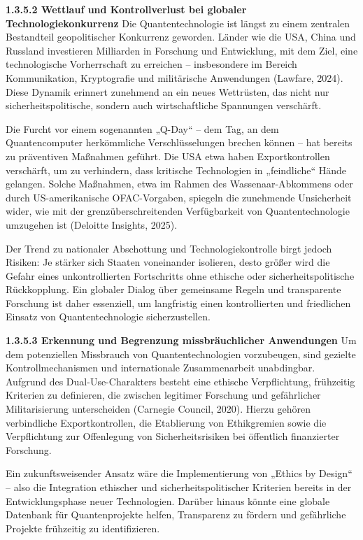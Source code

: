 \textbf{ 1.3.5.2 Wettlauf und Kontrollverlust bei globaler Technologiekonkurrenz} 
Die Quantentechnologie ist längst zu einem zentralen Bestandteil geopolitischer Konkurrenz geworden. Länder wie die USA, China und Russland investieren Milliarden in Forschung und Entwicklung, mit dem Ziel, eine technologische Vorherrschaft zu erreichen – insbesondere im Bereich Kommunikation, Kryptografie und militärische Anwendungen (Lawfare, 2024). Diese Dynamik erinnert zunehmend an ein neues Wettrüsten, das nicht nur sicherheitspolitische, sondern auch wirtschaftliche Spannungen verschärft.

Die Furcht vor einem sogenannten „Q-Day“ – dem Tag, an dem Quantencomputer herkömmliche Verschlüsselungen brechen können – hat bereits zu präventiven Maßnahmen geführt. Die USA etwa haben Exportkontrollen verschärft, um zu verhindern, dass kritische Technologien in „feindliche“ Hände gelangen. Solche Maßnahmen, etwa im Rahmen des Wassenaar-Abkommens oder durch US-amerikanische OFAC-Vorgaben, spiegeln die zunehmende Unsicherheit wider, wie mit der grenzüberschreitenden Verfügbarkeit von Quantentechnologie umzugehen ist (Deloitte Insights, 2025).

Der Trend zu nationaler Abschottung und Technologiekontrolle birgt jedoch Risiken: Je stärker sich Staaten voneinander isolieren, desto größer wird die Gefahr eines unkontrollierten Fortschritts ohne ethische oder sicherheitspolitische Rückkopplung. Ein globaler Dialog über gemeinsame Regeln und transparente Forschung ist daher essenziell, um langfristig einen kontrollierten und friedlichen Einsatz von Quantentechnologie sicherzustellen.

 \textbf{1.3.5.3 Erkennung und Begrenzung missbräuchlicher Anwendungen }
 Um dem potenziellen Missbrauch von Quantentechnologien vorzubeugen, sind gezielte Kontrollmechanismen und internationale Zusammenarbeit unabdingbar. Aufgrund des Dual-Use-Charakters besteht eine ethische Verpflichtung, frühzeitig Kriterien zu definieren, die zwischen legitimer Forschung und gefährlicher Militarisierung unterscheiden (Carnegie Council, 2020). Hierzu gehören verbindliche Exportkontrollen, die Etablierung von Ethikgremien sowie die Verpflichtung zur Offenlegung von Sicherheitsrisiken bei öffentlich finanzierter Forschung.

Ein zukunftsweisender Ansatz wäre die Implementierung von „Ethics by Design“ – also die Integration ethischer und sicherheitspolitischer Kriterien bereits in der Entwicklungsphase neuer Technologien. Darüber hinaus könnte eine globale Datenbank für Quantenprojekte helfen, Transparenz zu fördern und gefährliche Projekte frühzeitig zu identifizieren.

